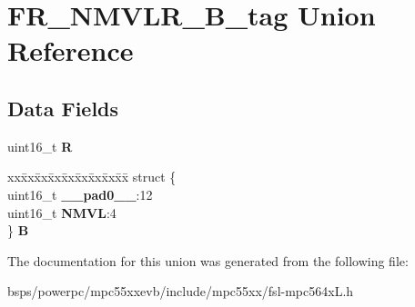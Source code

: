 \hypertarget{unionFR__NMVLR__16B__tag}{}\section{F\+R\+\_\+\+N\+M\+V\+L\+R\+\_\+B\+\_\+tag Union Reference}
\label{unionFR__NMVLR__16B__tag}
\subsection*{Data Fields}
\begin{DoxyCompactItemize}
\item 
\mbox{\label{unionFR__NMVLR__16B__tag_a11f4b97ab3885351eeeb13198fd76f51}} 
uint16\+\_\+t {\bfseries R}
\item 
\mbox{\label{unionFR__NMVLR__16B__tag_a48ae574364afa531e61bfc4f98b35bbe}} 
\begin{tabbing}
xx\=xx\=xx\=xx\=xx\=xx\=xx\=xx\=xx\=\kill
struct \{\\
\>uint16\_t {\bfseries \_\_pad0\_\_}:12\\
\>uint16\_t {\bfseries NMVL}:4\\
\} {\bfseries B}\\

\end{tabbing}\end{DoxyCompactItemize}


The documentation for this union was generated from the following file\+:\begin{DoxyCompactItemize}
\item 
bsps/powerpc/mpc55xxevb/include/mpc55xx/fsl-\/mpc564x\+L.\+h\end{DoxyCompactItemize}

